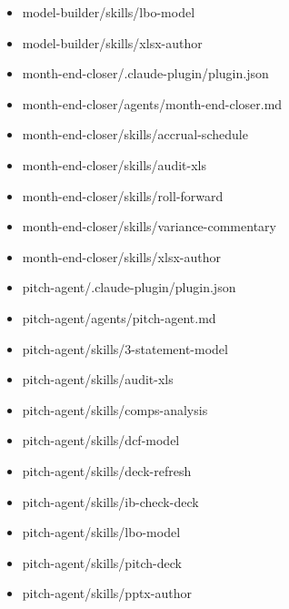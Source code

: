 \documentclass[11pt]{article}
\begin{document}
\begin{itemize}[leftmargin=*,itemsep=1pt,topsep=2pt]
\item \hspace*{1.8em}model-builder/skills/lbo-model
\item \hspace*{1.8em}model-builder/skills/xlsx-author
\item \hspace*{1.8em}month-end-closer/.claude-plugin/plugin.json
\item \hspace*{1.8em}month-end-closer/agents/month-end-closer.md
\item \hspace*{1.8em}month-end-closer/skills/accrual-schedule
\item \hspace*{1.8em}month-end-closer/skills/audit-xls
\item \hspace*{1.8em}month-end-closer/skills/roll-forward
\item \hspace*{1.8em}month-end-closer/skills/variance-commentary
\item \hspace*{1.8em}month-end-closer/skills/xlsx-author
\item \hspace*{1.8em}pitch-agent/.claude-plugin/plugin.json
\item \hspace*{1.8em}pitch-agent/agents/pitch-agent.md
\item \hspace*{1.8em}pitch-agent/skills/3-statement-model
\item \hspace*{1.8em}pitch-agent/skills/audit-xls
\item \hspace*{1.8em}pitch-agent/skills/comps-analysis
\item \hspace*{1.8em}pitch-agent/skills/dcf-model
\item \hspace*{1.8em}pitch-agent/skills/deck-refresh
\item \hspace*{1.8em}pitch-agent/skills/ib-check-deck
\item \hspace*{1.8em}pitch-agent/skills/lbo-model
\item \hspace*{1.8em}pitch-agent/skills/pitch-deck
\item \hspace*{1.8em}pitch-agent/skills/pptx-author

\end{itemize}
\end{document}
